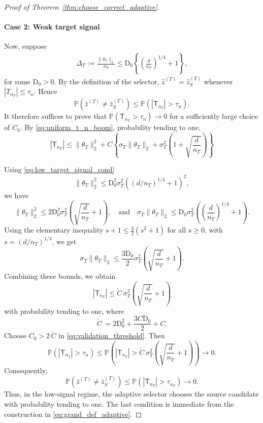 \documentclass[10pt]{article}
\newcommand{\wh}{\widehat}
\newcommand{\trg}{T}
\newcommand{\thetaT}{\theta_{\trg}}
\newcommand{\nT}{n_{\trg}}
\newcommand{\sigmaT}{\sigma_{\trg}}
\newcommand{\hatztar}{\wh{z}^{(\trg)}}
\newcommand{\DeltaT}{\Delta_{\trg}}
\newcommand{\rmT}{\mathsf{T}}
\newcommand{\src}{S}
\begin{document}
\begin{proof}[Proof of Theorem~\ref{thm:choose_correct_adaptive}]
\paragraph{Case 2: Weak target signal}
Now, suppose
\begin{align}
\label{eq:low_target_signal_cond}
    \DeltaT:=\frac{\|\thetaT\|_2}{\sigmaT}\le \mathrm{D}_0\left\{\left(\frac{d}{\nT}\right)^{1/4}+1\right\},
\end{align}
for some $\mathrm{D}_0>0$.
By the definition of the selector, $\hatztar=\hatztar_{\src}$ whenever $|T_{\nT}|\le \tau_{n}$. Hence
\[
    \mathbb P(\hatztar\neq \hatztar_{\src})\le \mathbb P(|\rmT_{\nT}|>\tau_{n}).
\]
It therefore suffices to prove that $\mathbb P(\rmT_{\nT}>\tau_{n})\to0$ for a sufficiently large choice of $C_0$. By \eqref{eq:uniform_t_n_boom}, probability tending to one,
\[
    |\rmT_{\nT}|\le \|\thetaT\|_2^2+C\left\{\sigmaT\|\thetaT\|_2+\sigmaT^2\left(1+\sqrt{\frac{d}{\nT}}\right)\right\}
\]

Using \eqref{eq:low_target_signal_cond}
\[
    \|\thetaT\|_2^2\le \mathrm{D}_0^2\sigmaT^2((d/\nT)^{1/4}+1)^2,
\]
we have
\[
    \|\thetaT\|_2^2\le 2\mathrm{D}_0^2\sigmaT^2\left(\sqrt{\frac{d}{\nT}}+1\right), \quad \mbox{and} \quad \sigmaT\|\thetaT\|_2\le \mathrm{D}_0\sigmaT^2\left(\left(\frac{d}{\nT}\right)^{1/4}+1\right).
\]
Using the elementary inequality $s+1\le \frac32(s^2+1)$ for all $s\ge0$, with $s=(d/\nT)^{1/4}$, we get
\[
\sigmaT\|\thetaT\|_2\le \frac{3\mathrm{D}_0}{2}\sigmaT^2\left(\sqrt{\frac{d}{\nT}}+1\right).
\]
Combining these bounds, we obtain
\[
    |\rmT_{\nT}|\le \check C\,\sigmaT^2\left(\sqrt{\frac{d}{\nT}}+1\right)
\]
with probability tending to one, where
\[
    \check C\:=2\mathrm D_0^2+\frac{3C\mathrm D_0}{2}+C.
\]
Choose $C_0>2\,\check{C}$ in \eqref{eq:validation_threshold}. Then
\[
\mathbb P(|\rmT_{\nT}|>\tau_{n})\le \mathbb P\left(|\rmT_{\nT}|>\check{C}\,\sigmaT^2\left(\sqrt{\frac{d}{\nT}}+1\right)\right)\to0.
\]
Consequently,
\[
    \mathbb P(\hatztar\neq \hatztar_{\src})\le \mathbb P(|\rmT_{\nT}|>\tau_{\nT})\to0.
\]
Thus, in the low-signal regime, the adaptive selector chooses the source candidate with probability tending to one. The last condition is immediate from the construction in \eqref{eq:grand_def_adaptive}.


    
\end{proof}
\end{document}
